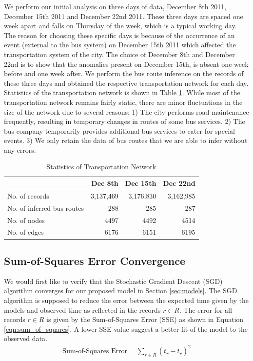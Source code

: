 \documentclass[conference]{IEEEtran.1.8}
\begin{document}
We perform our initial analysis on three days of data, December 8th 2011, December 15th 2011 and December 22nd 2011. These three days are spaced one week apart and falls on Thursday of the week, which is a typical working day. The reason for choosing these specific days is because of the occurrence of an event (external to the bus system) on December 15th 2011 which affected the transportation system of the city. The choice of December 8th and December 22nd is to show that the anomalies present on December 15th, is absent one week before and one week after. We perform the bus route inference on the records of these three days and obtained the respective transportation network for each day. Statistics of the transportation network is shown in Table \ref{tbl:statistics}. While most of the transportation network remains fairly static, there are minor fluctuations in the size of the network due to several reasons: 1) The city performs road maintenance frequently, resulting in temporary changes in routes of some bus services. 2) The bus company temporarily provides additional bus services to cater for special events. 3) We only retain the data of bus routes that we are able to infer without any errors.
\begin{table}[htb]
	\centering
	\caption{Statistics of Transportation Network}
	\label{tbl:statistics}
	\begin{tabular}{|p{2.1cm}|r|r|r|}
		\hline
			& Dec 8th & Dec 15th & Dec 22nd \\
		\hline
		No. of records & 3,137,469 & 3,176,830 & 3,162,985 \\
		\hline
		No. of inferred bus routes & 288 & 285 & 287 \\
		\hline
		No. of nodes & 4497 & 4492 & 4514 \\
		\hline
		No. of edges & 6176 & 6151 & 6195 \\
		\hline
	\end{tabular}
\end{table}

\subsection{Sum-of-Squares Error Convergence}

We would first like to verify that the Stochastic Gradient Descent (SGD) algorithm converges for our proposed model in Section \ref{sec:models}. The SGD algorithm is supposed to reduce the error between the expected time given by the models and observed time as reflected in the records $r \in R$. The error for all records $r \in R$ is given by the Sum-of-Squares Error (SSE) as shown in Equation \ref{eqn:sum_of_squares}. A lower SSE value suggest a better fit of the model to the observed data.
\begin{align}
	\label{eqn:sum_of_squares}
	\text{Sum-of-Squares Error} = \sum_{r \in R} (t_r - \hat{t}_r)^2 
\end{align}
\end{document}
